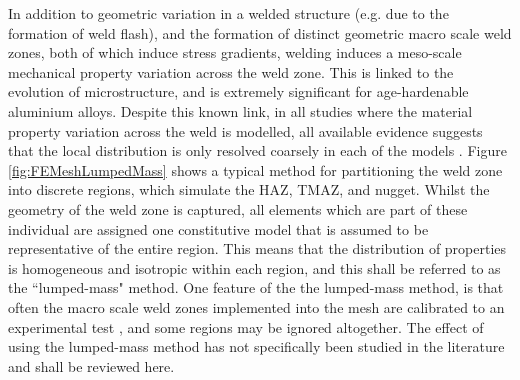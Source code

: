 In addition to geometric variation in a welded structure (e.g. due to the formation of weld flash), and the formation of distinct geometric macro scale weld zones, both of which induce stress gradients, welding induces a meso-scale mechanical property variation across the weld zone. This is linked to the evolution of microstructure, and is extremely significant for age-hardenable aluminium alloys. Despite this known link, in all studies where the material property variation across the weld is modelled, all available evidence suggests that the local distribution is only resolved coarsely in each of the models \cite{McWilliams2013,Grujicic2011,Zhao2001,Zadpoor2009,Reis2004,Kim2010,Kim2010a}. Figure \ref{fig:FEMeshLumpedMass} shows a typical method for partitioning the weld zone into discrete regions, which simulate the HAZ, TMAZ, and nugget. Whilst the geometry of the weld zone is captured, all elements which are part of these individual are assigned one constitutive model that is assumed to be representative of the entire region. This means that the distribution of properties is homogeneous and isotropic within each region, and this shall be referred to as the ``lumped-mass" method. One feature of the the lumped-mass method, is that often the macro scale weld zones implemented into the mesh are calibrated to an experimental test \cite{Grujicic2011,McWilliams2013}, and some regions may be ignored altogether. The effect of using the lumped-mass method has not specifically been studied in the literature and shall be reviewed here.


